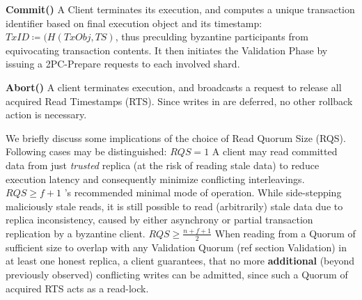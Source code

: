 \textbf{Commit()} A Client terminates its execution, and computes a unique transaction identifier based on final execution object and its timestamp: $TxID \coloneqq (H(TxObj, TS)$, thus preculding byzantine participants from equivocating transaction contents. It then initiates the Validation Phase by issuing a 2PC-Prepare requests to each involved shard.

\textbf{Abort()} A client terminates execution, and broadcasts a request to release all acquired Read Timestamps (RTS). Since writes in \sys are deferred, no other rollback action is necessary.


We briefly discuss some implications of the choice of Read Quorum Size (RQS). Following cases may be distinguished: \one \textbf{$RQS = 1$} A client may read committed data from just \textit{trusted} replica (at the risk of reading stale data) to reduce execution latency and consequently minimize conflicting interleavings. \two \textbf{$RQS \geq f+1$} \sys{}'s recommended minimal mode of operation. While side-stepping maliciously stale reads, it is still possible to read (arbitrarily) stale data due to replica inconsistency, caused by either asynchrony or partial transaction replication by a byzantine client.
\three \textbf{$RQS \geq \frac{n+f+1}{2}$} When reading from a Quorum of sufficient size to overlap with any Validation Quorum (ref section Validation) in at least one honest replica, a client guarantees, that no more \textbf{additional} (beyond previously observed) conflicting writes can be admitted, since such a Quorum of acquired RTS acts as a read-lock. 

